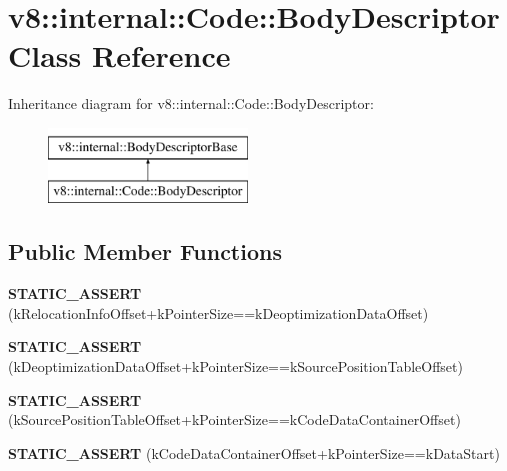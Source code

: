 \hypertarget{classv8_1_1internal_1_1Code_1_1BodyDescriptor}{}\section{v8\+:\+:internal\+:\+:Code\+:\+:Body\+Descriptor Class Reference}
\label{classv8_1_1internal_1_1Code_1_1BodyDescriptor}
Inheritance diagram for v8\+:\+:internal\+:\+:Code\+:\+:Body\+Descriptor\+:\begin{figure}[H]
\begin{center}
\leavevmode
\includegraphics[height=2.000000cm]{classv8_1_1internal_1_1Code_1_1BodyDescriptor}
\end{center}
\end{figure}
\subsection*{Public Member Functions}
\begin{DoxyCompactItemize}
\item 
\mbox{\label{classv8_1_1internal_1_1Code_1_1BodyDescriptor_a923e9341d3676d89bb53e5ee5b906fad}} 
{\bfseries S\+T\+A\+T\+I\+C\+\_\+\+A\+S\+S\+E\+RT} (k\+Relocation\+Info\+Offset+k\+Pointer\+Size==k\+Deoptimization\+Data\+Offset)
\item 
\mbox{\label{classv8_1_1internal_1_1Code_1_1BodyDescriptor_ae29073ac38f483c734ffb9513df2bafc}} 
{\bfseries S\+T\+A\+T\+I\+C\+\_\+\+A\+S\+S\+E\+RT} (k\+Deoptimization\+Data\+Offset+k\+Pointer\+Size==k\+Source\+Position\+Table\+Offset)
\item 
\mbox{\label{classv8_1_1internal_1_1Code_1_1BodyDescriptor_aeb1af5c801327a1e523ab260e463eed5}} 
{\bfseries S\+T\+A\+T\+I\+C\+\_\+\+A\+S\+S\+E\+RT} (k\+Source\+Position\+Table\+Offset+k\+Pointer\+Size==k\+Code\+Data\+Container\+Offset)
\item 
\mbox{\label{classv8_1_1internal_1_1Code_1_1BodyDescriptor_aa3faf1b66d1fa276904f573bacb4c374}} 
{\bfseries S\+T\+A\+T\+I\+C\+\_\+\+A\+S\+S\+E\+RT} (k\+Code\+Data\+Container\+Offset+k\+Pointer\+Size==k\+Data\+Start)
\end{DoxyCompactItemize}
